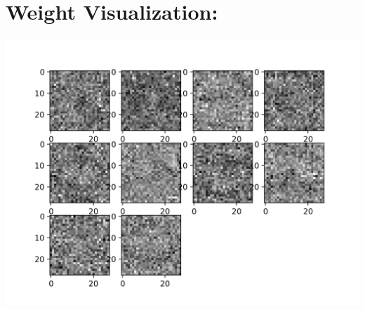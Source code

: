 \documentclass[12pt, letterpaper, notitlepage, twoside]{article}
\theoremstyle{definition}
\theoremstyle{plain}
\begin{document}
\section{Weight Visualization:}
\begin{center}
    \includegraphics{Imgs/Wgray.png}
\end{center}
\end{document}
